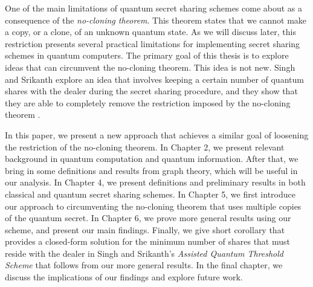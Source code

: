 One of the main limitations of quantum secret sharing schemes come about as a consequence of the \textit{no-cloning theorem}. This theorem states that we cannot make a copy, or a clone, of an unknown quantum state. As we will discuss later, this restriction presents several practical limitations for implementing secret sharing schemes in quantum computers. The primary goal of this thesis is to explore ideas that can circumvent the no-cloning theorem. This idea is not new. Singh and Srikanth explore an idea that involves keeping a certain number of quantum shares with the dealer during the secret sharing procedure, and they show that they are able to completely remove the restriction imposed by the no-cloning theorem \cite{singh_assisted_2004}.

In this paper, we present a new approach that achieves a similar goal of loosening the restriction of the no-cloning theorem. In Chapter 2, we present relevant background in quantum computation and quantum information. After that, we bring in some definitions and results from graph theory, which will be useful in our analysis. In Chapter 4, we present definitions and preliminary results in both classical and quantum secret sharing schemes. In Chapter 5, we first introduce our approach to circumventing the no-cloning theorem that uses multiple copies of the quantum secret. In Chapter 6, we prove more general results using our scheme, and present our main findings. Finally, we give short corollary that provides a closed-form solution for the minimum number of shares that must reside with the dealer in Singh and Srikanth's \textit{Assisted Quantum Threshold Scheme} that follows from our more general results. In the final chapter, we discuss the implications of our findings and explore future work.